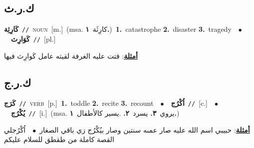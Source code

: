 \documentclass[10pt,a4paper,twoside]{article} %
\begin{document}
\begin{multicols}{2}
\vspace{-3mm}
\subsection*{\color{blue}\foreignlanguage{arabic}{ك.ر.ث}\color{blue}{}} 

{\setlength\topsep{0pt}\textbf{\foreignlanguage{arabic}{كَارِثِة}}\ {\color{gray}\texttt{//}\color{black}}\ \textsc{noun}\ [m.]\ \color{gray}(msa. \foreignlanguage{arabic}{كارِثَة}~\foreignlanguage{arabic}{\textbf{١.}})\color{black}\ \textbf{1.}~catastrophe  \textbf{2.}~disaster  \textbf{3.}~tragedy\ \ $\bullet$\ \ \setlength\topsep{0pt}\textbf{\foreignlanguage{arabic}{كَوَارِث}}\ {\color{gray}\texttt{//}\color{black}}\ [pl.]\  \begin{flushright}\color{gray}\foreignlanguage{arabic}{\textbf{\underline{\foreignlanguage{arabic}{أمثلة}}}: فتت عليه الغرفة لقيته عامل كَوارِث فيها}\end{flushright}\color{black}} \vspace{2mm}

\vspace{-3mm}
\subsection*{\color{blue}\foreignlanguage{arabic}{ك.ر.ج}\color{blue}{}} 

{\setlength\topsep{0pt}\textbf{\foreignlanguage{arabic}{كَرَج}}\ {\color{gray}\texttt{//}\color{black}}\ \textsc{verb}\ [p.]\ \textbf{1.}~toddle  \textbf{2.}~recite  \textbf{3.}~recount\ \ $\bullet$\ \ \setlength\topsep{0pt}\textbf{\foreignlanguage{arabic}{اُكْرُج}}\ {\color{gray}\texttt{//}\color{black}}\ [c.]\ \ $\bullet$\ \ \setlength\topsep{0pt}\textbf{\foreignlanguage{arabic}{يُكْرُج}}\ {\color{gray}\texttt{//}\color{black}}\ [i.]\ \color{gray}(msa. \foreignlanguage{arabic}{يروي}~\foreignlanguage{arabic}{\textbf{٣.}}  \foreignlanguage{arabic}{يسرد}~\foreignlanguage{arabic}{\textbf{٢.}}  .\foreignlanguage{arabic}{يسير كالأطفال}~\foreignlanguage{arabic}{\textbf{١.}})\color{black}\  \begin{flushright}\color{gray}\foreignlanguage{arabic}{\textbf{\underline{\foreignlanguage{arabic}{أمثلة}}}: حبيبي اسم الله عليه صار عمىه سنتين وصار بيُكْرُج زي باقي الصغار\ $\bullet$\ \  اُكْرُجلي القصة كاملة من طقطق للسلام عليكم}\end{flushright}\color{black}} \vspace{2mm}


\end{multicols}
\end{document}
